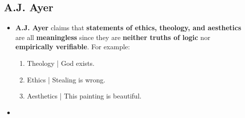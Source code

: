 \documentclass{article}
\begin{document}
    \subsection*{A.J. Ayer}
    \begin{itemize}
        \item \textbf{A.J. Ayer} claims that \textbf{statements of ethics, theology, and aesthetics} are all \textbf{meaningless} since they are \textbf{neither truths of logic} nor \textbf{empirically verifiable}. For example:
        \begin{enumerate}
            \item Theology | God exists.
            \item Ethics | Stealing is wrong.
            \item Aesthetics | This painting is beautiful.
        \end{enumerate}
        \item
    \end{itemize}
\end{document}
